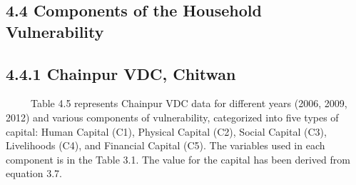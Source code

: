 \documentclass[12pt, a4paper]{article}
\begin{document}
\subsection*{4.4 Components of the Household Vulnerability}
\renewcommand{\thepage}{\arabic{page}}
\subsection*{4.4.1 Chainpur VDC, Chitwan}
\ \ \ \ \ Table 4.5 represents Chainpur VDC data for different years (2006, 2009, 2012) and various components of vulnerability, categorized into five types of capital: Human Capital (C1), Physical Capital (C2), Social Capital (C3), Livelihoods (C4), and Financial Capital (C5). The variables used in each component is in the Table 3.1. The value for the capital has been derived from equation 3.7.
\end{document}
